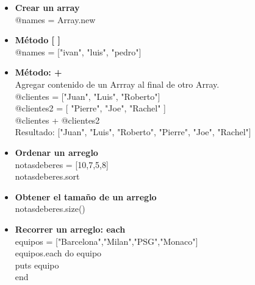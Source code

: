 \documentclass[11pt]{article} %
\begin{document}
\begin{itemize}
      \item {\bf Crear un array}\\
	\hspace*{7mm} @names = Array.new\\
      \item {\bf Método [ ]} \\
	\hspace*{7mm} @names = ["ivan", "luis", "pedro"] \\
      \item {\bf Método: +}\\
	\hspace*{7mm} Agregar contenido de un Arrray al final de otro Array.\\
	\hspace*{7mm}@clientes = ["Juan", "Luis", "Roberto"]\\
	\hspace*{7mm}@clientes2 = [ "Pierre", "Joe", "Rachel" ]\\
	\hspace*{7mm}@clientes + @clientes2 \\
           \hspace*{7mm} Resultado: ["Juan", "Luis", "Roberto", "Pierre", "Joe", "Rachel"]\\
     \item {\bf Ordenar un arreglo}\\
	\hspace*{7mm} notasdeberes = [10,7,5,8]\\
	\hspace*{7mm} notasdeberes.sort\\
    \item  {\bf Obtener el tamaño de un arreglo}\\
	\hspace*{7mm} notasdeberes.size()\\

     \item  {\bf Recorrer un arreglo: each}\\
    	\hspace*{7mm} equipos = ["Barcelona","Milan","PSG","Monaco"]\\
	\hspace*{7mm} equipos.each do equipo\\
 	\hspace*{14mm} puts equipo\\
	\hspace*{7mm} end\\
	

\end{itemize}
\end{document}
